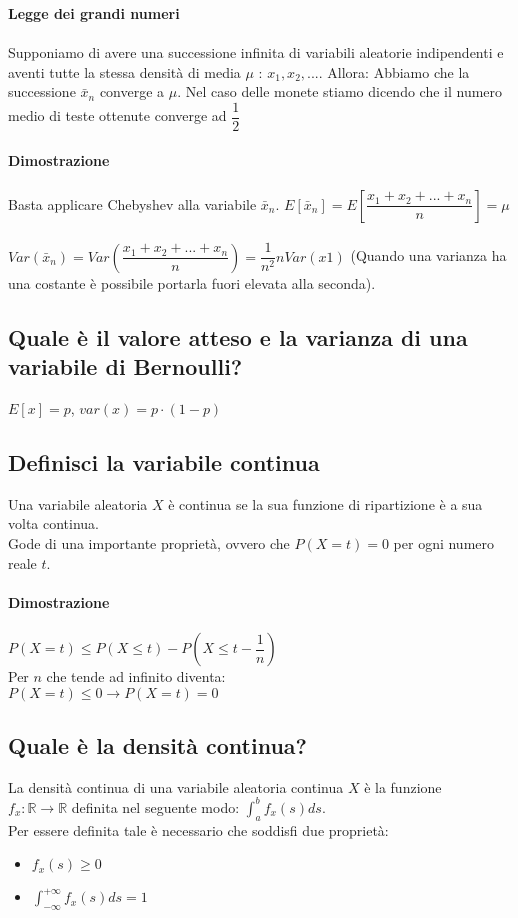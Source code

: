 \documentclass[a4paper,12pt]{report}
\begin{document}
	\textbf{Legge dei grandi numeri} \\\\
	Supponiamo di avere una successione infinita di variabili aleatorie indipendenti e aventi tutte la stessa densità di media $\mu$ : $x_1, x_2, ...$.
	Allora:
	Abbiamo che la successione $\bar x_{n}$ converge a $\mu$. Nel caso delle monete stiamo dicendo che il numero medio di teste ottenute converge ad $\dfrac{1}{2}$
	\\\\
	\textbf{Dimostrazione} \\\\
	Basta applicare Chebyshev alla variabile $\bar x_{n}$.
	$E[\bar x_{n}] = E[\dfrac{x_1+x_2+...+x_n}{n}] = \mu$ \\\\
	$Var(\bar x_{n}) = Var(\dfrac{x_1+x_2+...+x_n}{n}) = \dfrac{1}{n^2} n Var(x1)$
	(Quando una varianza ha una costante è possibile portarla fuori elevata alla seconda).
	\subsection{Quale è il valore atteso e la varianza di una variabile di Bernoulli?}
	$E[x] = p$, $var(x) = p \cdot (1 - p)$
	
	\newpage
	
	\subsection{Definisci la variabile continua}
	Una variabile aleatoria $X$ è continua se la sua funzione di ripartizione è a sua volta continua. \\
	Gode di una importante proprietà, ovvero che $P(X = t) = 0$ per ogni numero reale $t$. \\\\
	\textbf{Dimostrazione} \\\\
	$P(X = t) \leq P(X \leq t) - P(X \leq t - \dfrac{1}{n})$ \\
	Per $n$ che tende ad infinito diventa: \\
	$P(X = t) \leq 0 \rightarrow P(X = t) = 0$ 
	\subsection{Quale è la densità continua?}
	La densità continua di una variabile aleatoria continua $X$ è la funzione \\
	$f_x : \mathbb{R} \rightarrow \mathbb{R}$ definita nel seguente modo:
	$\int_{a}^{b} f_x(s)ds$. \\
	Per essere definita tale è necessario che soddisfi due proprietà:
	\begin{itemize}
		\item $f_x(s) \geq 0$
		\item $\int_{-\infty}^{+\infty}f_x(s)ds = 1$
	\end{itemize}
\end{document}
